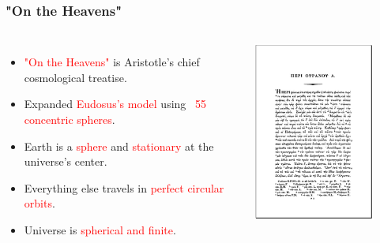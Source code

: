 \documentclass[aspectratio=1611, 9pt]{beamer}
\begin{document}
\begin{frame}
  \frametitle{"On the Heavens"}
  \begin{columns}
    \begin{itemize}
      \item \textcolor{red}{"On the Heavens"} is Aristotle's chief cosmological treatise.
      \item Expanded \textcolor{red}{Eudosus's model} using \textcolor{red}{~55 concentric spheres}.
      \item Earth is a \textcolor{red}{sphere} and \textcolor{red}{stationary} at the universe's center.
      \item Everything else travels in \textcolor{red}{perfect circular orbits}.
      \item Universe is \textcolor{red}{spherical and finite}.
    \end{itemize}

    \begin{center}
      \includegraphics[width=0.80\textwidth]{pictures/heaven.png}
    \end{center}
  \end{columns}
\end{frame}
\end{document}
